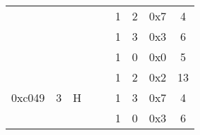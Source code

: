 \documentclass[11pt]{homework}
\begin{document}
\begin{arabicparts}
\begin{center}
\begin{tabular}{|c|c|c|c|c|c|c|c|c|}
            \cline{6-9}
                                     &                                                                        &                                                                   &                                                                    &                                                                      & 1                        & 2         & 0x7 & 4             \\
            \cline{6-9}
                                     &                                                                        &                                                                   &                                                                    &                                                                      & 1                        & 3         & 0x3 & 6             \\
            \cline{6-9}
                                     &                                                                        &                                                                   &                                                                    &                                                                      & 1                        & 0         & 0x0 & 5             \\
            \hline
            \multirow{4}{*}{0xc049}  & \multirow{4}{*}{3}                                                     & \multirow{4}{*}{H}                                                & \multirow{4}{*}{}                                                  & \multirow{4}{*}{}                                                    & 1                        & 2         & 0x2 & 13            \\
            \cline{6-9}
                                     &                                                                        &                                                                   &                                                                    &                                                                      & 1                        & 3         & 0x7 & 4             \\
            \cline{6-9}
                                     &                                                                        &                                                                   &                                                                    &                                                                      & 1                        & 0         & 0x3 & 6             \\

\end{tabular}
\end{center}
\end{arabicparts}
\end{document}
